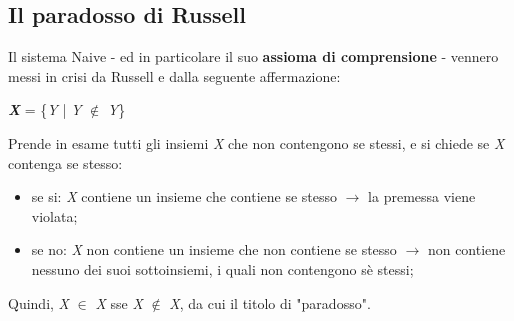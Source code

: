 \documentclass[12pt]{article}
\begin{document}
\subsection{Il paradosso di Russell}
Il sistema Naive - ed in particolare il suo \textbf{assioma di comprensione} - vennero messi in crisi da Russell e dalla seguente affermazione:
\begin{center}
    \textbf{\textit{X}} = \{\textit{Y} | \textit{Y} $\notin$ \textit{Y}\}
\end{center}
Prende in esame tutti gli insiemi \textit{X} che non contengono se stessi, e si chiede se \textit{X} contenga se stesso:
\begin{itemize}
    \item se si: \textit{X} contiene un insieme che contiene se stesso $\rightarrow$ la premessa viene violata;
    \item se no: \textit{X} non contiene un insieme che non contiene se stesso $\rightarrow$ non contiene nessuno dei suoi sottoinsiemi, i quali non contengono sè stessi;
\end{itemize}
Quindi, \textit{X} $\in$ \textit{X} sse \textit{X} $\notin$ \textit{X}, da cui il titolo di "paradosso".
\end{document}
